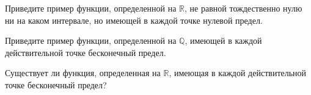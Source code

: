 \documentclass[a4paper, 12pt, num=32, date=]{listok}
\begin{document}
\begin{problem}
    Приведите пример функции, определенной на $\mathbb{R}$, не равной тождественно нулю ни на каком интервале, но имеющей в каждой точке нулевой предел.
\end{problem}


\begin{problem}
\begin{probparts}
    \item Приведите пример функции, определенной на $\mathbb{Q}$,
        имеющей в каждой действительной точке бесконечный предел.
    \item Существует ли функция, определенная на $\mathbb{R}$, имеющая в каждой действительной точке бесконечный предел?
\end{probparts}
\end{problem}
\end{document}
